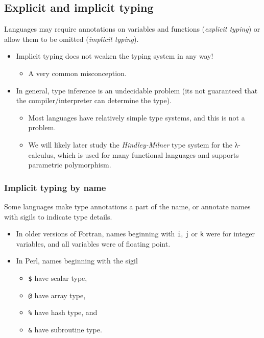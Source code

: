 \documentclass[11pt]{article}
\theoremstyle{definition}
\begin{document}
\subsection{Explicit and implicit typing}
\label{sec:org3546a06}

Languages may require annotations on variables and functions
(\emph{explicit typing}) or allow them to be omitted (\emph{implicit typing}).
\begin{itemize}
\item Implicit typing does not weaken the typing system in any way!
\begin{itemize}
\item A very common misconception.
\end{itemize}
\item In general, type inference is an undecidable problem
(its not guaranteed that the compiler/interpreter can
determine the type).
\begin{itemize}
\item Most languages have relatively simple type systems,
and this is not a problem.
\item We will likely later study the \emph{Hindley-Milner} type system
for the λ-calculus, which is used for many
functional languages and supports parametric polymorphism.
\end{itemize}
\end{itemize}

\subsubsection{Implicit typing by name}
\label{sec:orgc00dfce}

Some languages make type annotations a part of the name,
or annotate names with sigils to indicate type details.
\begin{itemize}
\item In older versions of Fortran, names beginning with
\texttt{i}, \texttt{j} or \texttt{k} were for integer variables,
and all variables were of floating point.
\item In Perl, names beginning with the sigil
\begin{itemize}
\item \texttt{\$} have scalar type,
\item \texttt{@} have array type,
\item \texttt{\%} have hash type, and
\item \texttt{\&} have subroutine type.
\end{itemize}
\end{itemize}
\end{document}
